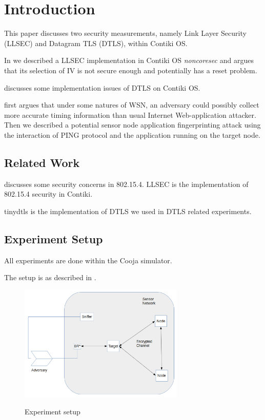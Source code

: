 \chapter{Introduction}
This paper discusses two security measurements, namely Link Layer Security (LLSEC) and Datagram TLS (DTLS), within Contiki OS.

In  we described a LLSEC implementation in Contiki OS \textit{noncoresec} and argues that its selection of IV is not secure enough and potentially has a reset problem.

 discusses some implementation issues of DTLS on Contiki OS.

 first argues that under some natures of WSN, an adversary could possibly collect more accurate timing information than usual Internet Web-application attacker. Then we described a potential sensor node application fingerprinting attack using the interaction of PING protocol and the application running on the target node.

\section{Related Work}
\cite{802154Sec} discusses some security concerns in 802.15.4.  LLSEC\cite{LLSEC} is the implementation of 802.15.4 security in Contiki.

tinydtls\cite{tinydtls} is the implementation of DTLS we used in DTLS related experiments.

\section{Experiment Setup}
All experiments are done within the Cooja simulator.

The setup is as described in .

\begin{figure}
\centering
{
	\includegraphics[width=0.7\textwidth,]{fig/setup.png}
}
\caption{Experiment setup} \label{fig: Setup}
\end{figure}

